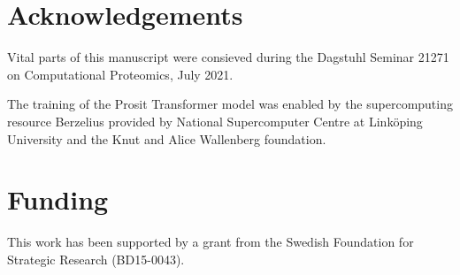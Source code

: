 \documentclass[10pt,a4paper]{article}
\begin{document}
\section*{Acknowledgements}
Vital parts of this manuscript were consieved during the Dagstuhl Seminar 21271 on Computational Proteomics, July 2021. 

The training of the Prosit Transformer model was enabled by the supercomputing resource Berzelius provided by National Supercomputer Centre at Linköping University and the Knut and Alice Wallenberg foundation.

\section*{Funding}

This work has been supported by a grant from the Swedish Foundation for Strategic Research (BD15-0043).




\end{document}
